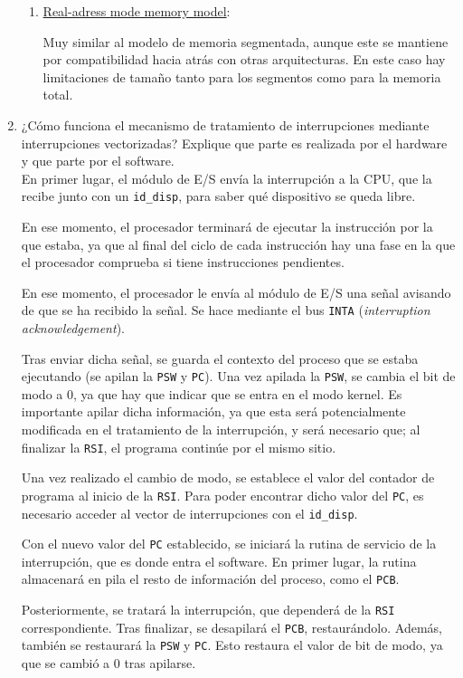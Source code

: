\begin{ejercicio}
\begin{enumerate}
\begin{enumerate}
            \item \ul{Real-adress mode memory model}: 

            Muy similar al modelo de memoria segmentada, aunque este se mantiene por compatibilidad hacia atrás con otras arquitecturas. En este caso hay limitaciones de tamaño tanto para los segmentos como para la memoria total.
        \end{enumerate}

        \item ¿Cómo funciona el mecanismo de tratamiento de interrupciones mediante interrupciones vectorizadas? Explique que parte es realizada por el hardware y que parte por el software.\\

        En primer lugar, el módulo de E/S envía la interrupción a la CPU, que la recibe junto con un \verb|id_disp|, para saber qué dispositivo se queda libre.

        En ese momento, el procesador terminará de ejecutar la instrucción por la que estaba, ya que al final del ciclo de cada instrucción hay una fase en la que el procesador comprueba si tiene instrucciones pendientes.
        
        En ese momento, el procesador le envía al módulo de E/S una señal avisando de que se ha recibido la señal. Se hace mediante el bus \verb|INTA| (\emph{interruption acknowledgement}).

        Tras enviar dicha señal, se guarda el contexto del proceso que se estaba ejecutando (se apilan la \verb|PSW| y \verb|PC|). Una vez apilada la \verb|PSW|, se cambia el bit de modo a 0, ya que hay que indicar que se entra en el modo kernel. Es importante apilar dicha información, ya que esta será potencialmente modificada en el tratamiento de la interrupción, y será necesario que; al finalizar la \verb|RSI|, el programa continúe por el mismo sitio.
        
        Una vez realizado el cambio de modo, se establece el valor del contador de programa al inicio de la \verb|RSI|. Para poder encontrar dicho valor del \verb|PC|, es necesario acceder al vector de interrupciones con el \verb|id_disp|.

        Con el nuevo valor del \verb|PC| establecido, se iniciará la rutina de servicio de la interrupción, que es donde entra el software. En primer lugar, la rutina almacenará en pila el resto de información del proceso, como el \verb|PCB|.

        Posteriormente, se tratará la interrupción, que dependerá de la \verb|RSI| correspondiente. Tras finalizar, se desapilará el \verb|PCB|, restaurándolo. Además, también se restaurará la \verb|PSW| y \verb|PC|. Esto restaura el valor de bit de modo, ya que se cambió a 0 tras apilarse. 
        

\end{enumerate}
\end{ejercicio}
